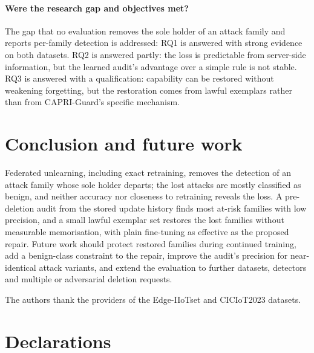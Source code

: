 \documentclass[pdflatex,sn-mathphys-num,iicol]{sn-jnl}
\begin{document}
\paragraph{Were the research gap and objectives met?} The gap that no evaluation removes the sole holder of an attack family and reports per-family detection is addressed: RQ1 is answered with strong evidence on both datasets. RQ2 is answered partly: the loss is predictable from server-side information, but the learned audit's advantage over a simple rule is not stable. RQ3 is answered with a qualification: capability can be restored without weakening forgetting, but the restoration comes from lawful exemplars rather than from CAPRI-Guard's specific mechanism.

\section{Conclusion and future work}\label{sec:conclusion}

Federated unlearning, including exact retraining, removes the detection of an attack family whose sole holder departs; the lost attacks are mostly classified as benign, and neither accuracy nor closeness to retraining reveals the loss. A pre-deletion audit from the stored update history finds most at-risk families with low precision, and a small lawful exemplar set restores the lost families without measurable memorisation, with plain fine-tuning as effective as the proposed repair. Future work should protect restored families during continued training, add a benign-class constraint to the repair, improve the audit's precision for near-identical attack variants, and extend the evaluation to further datasets, detectors and multiple or adversarial deletion requests.

\backmatter

The authors thank the providers of the Edge-IIoTset and CICIoT2023 datasets.

\section*{Declarations}\label{sec:decl}
\end{document}
